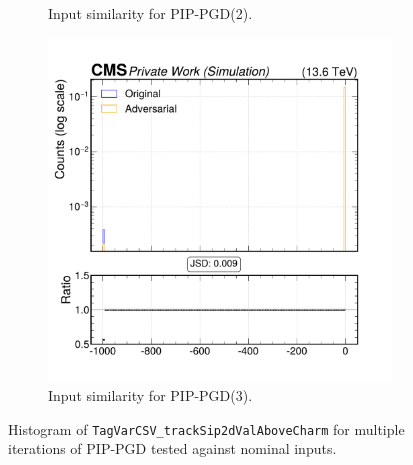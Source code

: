 \begin{figure}[h]
\begin{subfigure}[t]{0.32\textwidth}
    \caption*{Input similarity for PIP-PGD(2).}
  \end{subfigure}\hfill
  \begin{subfigure}[t]{0.32\textwidth}
    \includegraphics[width=\linewidth]{media/output/features/compare/combined_it_3/cmp_global_features_TagVarCSV_trackSip2dValAboveCharm.pdf}
    \caption*{Input similarity for PIP-PGD(3).}
  \end{subfigure}

  \caption*{Histogram of \texttt{TagVarCSV\_trackSip2dValAboveCharm} for multiple iterations of PIP-PGD tested against nominal inputs.}
  \label{fig:combined_input_TagVarCSV_trackSip2dValAboveCharm}
\end{figure}

